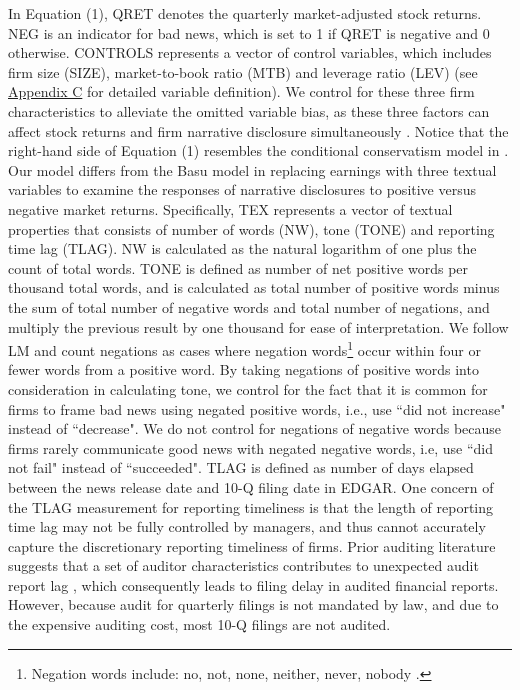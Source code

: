 \documentclass[a4paper]{article}
\begin{document}
\begin{spacing}{2}
In Equation (1), QRET denotes the quarterly market-adjusted stock returns. NEG is an indicator for bad news, which is set to 1 if QRET is negative and 0 otherwise. CONTROLS represents a vector of control variables, which includes firm size (SIZE), market-to-book ratio (MTB) and leverage ratio (LEV) (see \hyperref[appc]{Appendix C} for detailed variable definition). We control for these three firm characteristics to alleviate the omitted variable bias, as these three factors can affect stock returns and firm narrative disclosure simultaneously . %
Notice that the right-hand side of Equation (1) resembles the conditional conservatism model in . Our model differs from the Basu model in replacing earnings with three textual variables to examine the responses of narrative disclosures to positive versus negative market returns. Specifically, TEX represents a vector of textual properties that consists of number of words (NW), tone (TONE) and reporting time lag (TLAG). NW is calculated as the natural logarithm of one plus the count of total words. TONE is defined as number of net positive words per thousand total words, and is calculated as total number of positive words minus the sum of total number of negative words and total number of negations, and multiply the previous result by one thousand for ease of interpretation. We follow LM and count negations as cases where negation words\footnote{Negation words include: no, not, none, neither, never, nobody .} occur within four or fewer words from a positive word. By taking negations of positive words into consideration in calculating tone, we control for the fact that it is common for firms to frame bad news using negated positive words, i.e., use ``did not increase" instead of ``decrease". We do not control for negations of negative words because firms rarely communicate good news with negated negative words, i.e, use ``did not fail" instead of ``succeeded". TLAG is defined as number of days elapsed between the news release date and 10-Q filing date in EDGAR. One concern of the TLAG measurement for reporting timeliness is that the length of reporting time lag may not be fully controlled by managers, and thus cannot accurately capture the discretionary reporting timeliness of firms. Prior auditing literature suggests that a set of auditor characteristics contributes to unexpected audit report lag , which consequently leads to filing delay in audited financial reports. However, because audit for quarterly filings is not mandated by law, and due to the expensive auditing cost, most 10-Q filings are not audited.


\end{spacing}
\end{document}
